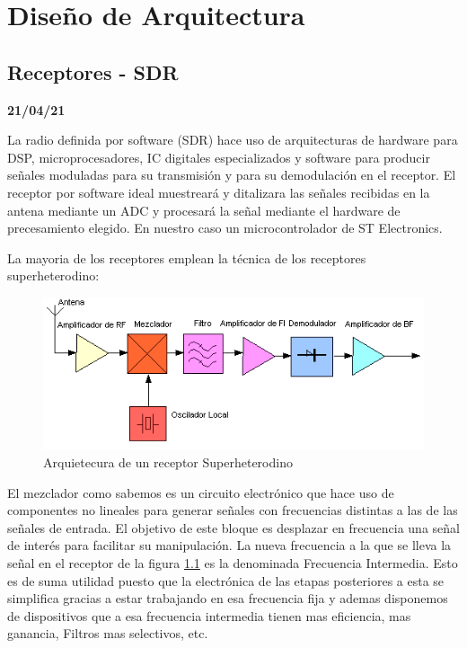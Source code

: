 \documentclass[a4paper,12pt]{report} %
\begin{document}
\chapter{Diseño de Arquitectura}

\section{Receptores - SDR} 

\textbf{21/04/21}

La radio definida por software (SDR)  hace uso de arquitecturas de hardware para DSP, microprocesadores, IC digitales especializados y software para producir señales moduladas para su transmisión y para su demodulación en el receptor. El receptor por software ideal muestreará y ditalizara las señales recibidas en la antena mediante un ADC y procesará la señal mediante el hardware de precesamiento elegido. En nuestro caso un microcontrolador de ST Electronics.

La mayoria de los receptores emplean la técnica de los receptores superheterodino: 

\begin{figure}[H]
	\centering
	\includegraphics[scale=0.7]{Imagenes/Arquitectura/superhetero}
	\caption{Arquietecura de un receptor Superheterodino}
	\label{super}
\end{figure}


El mezclador como sabemos es un circuito electrónico que hace uso de componentes no lineales para generar señales con frecuencias distintas a las de las señales de entrada. El objetivo de este bloque es desplazar en frecuencia una señal de interés para facilitar su manipulación. La nueva frecuencia a la que se lleva la señal en el receptor de la figura \ref{super} es la denominada Frecuencia Intermedia. Esto es de suma utilidad puesto que la electrónica de las etapas posteriores a esta se simplifica gracias a estar trabajando en esa frecuencia fija y ademas disponemos de dispositivos que a esa frecuencia intermedia tienen mas eficiencia, mas ganancia, Filtros mas selectivos, etc.
\end{document}
